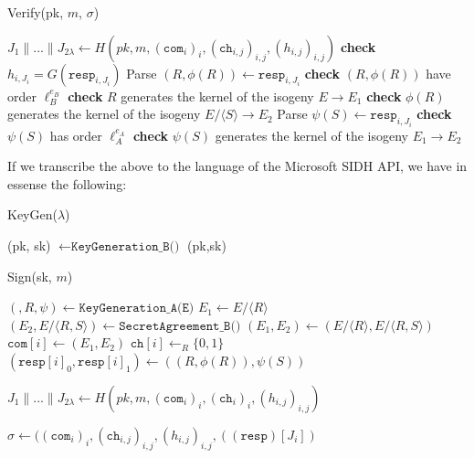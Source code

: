 \begin{algorithm}[H]
\caption{Verify(pk, $m$, $\sigma$)}\label{euclid}
\begin{algorithmic}[1]
\State $J_{1} \parallel ... \parallel J_{2\lambda} \gets H(pk, m, (\texttt{com}_{i})_{i},(\texttt{ch}_{i,j})_{i,j},(h_{i,j})_{i,j})$
	\State \textbf{check} $h_{i,J_{i}} = G(\texttt{resp}_{i,J_{i}})$
		\State Parse $(R,\phi(R)) \gets \texttt{resp}_{i,J_{i}}$
		\State \textbf{check} $(R, \phi(R))$ have order $\ell^{e_{B}}_{B}$
		\State \textbf{check} $R$ generates the kernel of the isogeny $E \rightarrow E_{1}$
		\State \textbf{check} $\phi(R)$ generates the kernel of the isogeny $E/\langle S \rangle \rightarrow E_{2}$
	\Else
		\State Parse $\psi(S) \gets \texttt{resp}_{i,J_{i}}$
		\State \textbf{check} $\psi(S)$ has order $\ell^{e_{A}}_{A}$
		\State \textbf{check} $\psi(S)$ generates the kernel of the isogeny $E_{1} \rightarrow E_{2}$
	\EndIf
\EndFor

	\State {}
\EndIf
\end{algorithmic}
\end{algorithm}

If we transcribe the above to the language of the Microsoft SIDH API, we have in essense the following:\\

\begin{algorithm}
\caption{KeyGen($\lambda$)}\label{euclid}
\begin{algorithmic}[1]
\State (pk, sk) $\gets \texttt{KeyGeneration\_B()}$
\State \Return (pk,sk)
\end{algorithmic}
\end{algorithm}

\begin{algorithm}
\caption{Sign(sk, $m$)}\label{euclid}
\begin{algorithmic}[1]
	\State $(, R, \psi) \gets \texttt{KeyGeneration\_A(E)}$
	\State $E_{1} \gets E/\langle R \rangle$
	\State $(E_{2},E/\langle R,S \rangle) \gets \texttt{SecretAgreement\_B()}$
	\State $(E_{1},E_{2}) \gets (E/\langle R \rangle, E/\langle R,S \rangle)$
	\State $\texttt{com}[i] \gets (E_{1}, E_{2})$
	\State $\texttt{ch}[i] \gets_{R} \{0,1\}$
	\State $(\texttt{resp}[i]_{0}, \texttt{resp}[i]_{1}) \gets ((R,\phi(R)), \psi(S))$
	
\EndFor

\State $J_{1} \parallel ... \parallel J_{2\lambda} \gets H(pk, m, (\texttt{com}_{i})_{i},(\texttt{ch}_{i})_{i},(h_{i,j})_{i,j})$

\State \Return $\sigma \gets ((\texttt{com}_{i})_{i}, (\texttt{ch}_{i,j})_{i,j}, (h_{i,j})_{i,j}, ((\texttt{resp})[J_{i}])$
\end{algorithmic}
\end{algorithm}
